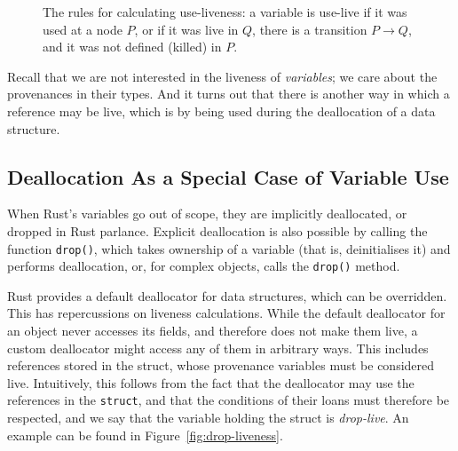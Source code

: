 \documentclass[11pt,a4paper,twoside,openany]{report}
\newcommand{\InRust}[1]{\texttt{#1}}
\renewcommand\_{\textunderscore\allowbreak}
\begin{document}
\begin{figure}
  \caption[Rules for Calculating Use-Liveness]{The rules for calculating
    use-liveness: a variable is use-live if it was used at a node $P$, or if it
    was live in $Q$, there is a transition $P\rightarrow{}Q$, and it was not
    defined (killed) in $P$.}\label{fig:var-use-live}
\end{figure}

Recall that we are not interested in the liveness of \emph{variables};
we care about the provenances in their types. And it turns out that there is
another way in which a reference may be live, which is by being used during the
deallocation of a data structure.

\subsection{Deallocation As a Special Case of Variable Use}\label{sec:deall-as-spec}
When Rust's variables go out of scope, they are implicitly deallocated, or
dropped in Rust parlance. Explicit deallocation is also possible by calling the
function \InRust{drop()}, which takes ownership of a variable (that is,
deinitialises it) and performs deallocation, or, for complex objects, calls the
\InRust{drop()} method.

Rust provides a default deallocator for data structures, which can be
overridden. This has repercussions on liveness calculations. While the default
deallocator for an object never accesses its fields, and therefore does not make
them live, a custom deallocator might access any of them in arbitrary ways. This
includes references stored in the struct, whose provenance variables must be
considered live. Intuitively, this follows from the fact that the deallocator
may use the references in the \InRust{struct}, and that the conditions of their
loans must therefore be respected, and we say that the variable holding the
struct is \textit{drop-live}. An example can be found in
Figure~\ref{fig:drop-liveness}.
\end{document}
